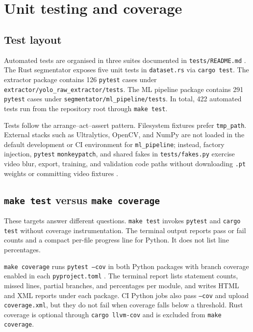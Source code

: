 \section{Unit testing and coverage}
\label{sec:testing}

\subsection{Test layout}

Automated tests are organised in three suites documented in \texttt{tests/README.md} \cite{TestsGDPR}. The Rust segmentator exposes five unit tests in \texttt{dataset.rs} via \texttt{cargo test}. The extractor package contains 126 \texttt{pytest} cases under \texttt{extractor/yolo\_raw\_extractor/tests}. The ML pipeline package contains 291 \texttt{pytest} cases under \texttt{segmentator/ml\_pipeline/tests}. In total, 422 automated tests run from the repository root through \texttt{make test}.

Tests follow the arrange--act--assert pattern. Filesystem fixtures prefer \texttt{tmp\_path}. External stacks such as Ultralytics, OpenCV, and NumPy are not loaded in the default development or CI environment for \texttt{ml\_pipeline}; instead, factory injection, \texttt{pytest} \texttt{monkeypatch}, and shared fakes in \texttt{tests/fakes.py} exercise video blur, export, training, and validation code paths without downloading \texttt{.pt} weights or committing video fixtures \cite{UnittestMock,TestsGDPR}.

\subsection{\texttt{make test} versus \texttt{make coverage}}

These targets answer different questions. \texttt{make test} invokes \texttt{pytest} and \texttt{cargo test} without coverage instrumentation. The terminal output reports pass or fail counts and a compact per-file progress line for Python. It does not list line percentages.

\texttt{make coverage} runs \texttt{pytest --cov} in both Python packages with branch coverage enabled in each \texttt{pyproject.toml} \cite{PytestCov,CoveragePy}. The terminal report lists statement counts, missed lines, partial branches, and percentages per module, and writes HTML and XML reports under each package. CI Python jobs also pass \texttt{--cov} and upload \texttt{coverage.xml}, but they do not fail when coverage falls below a threshold. Rust coverage is optional through \texttt{cargo llvm-cov} and is excluded from \texttt{make coverage}.

